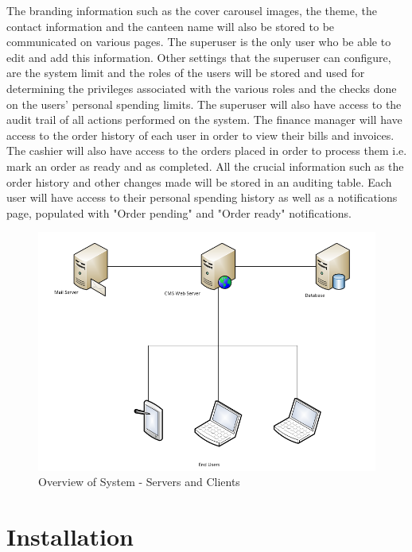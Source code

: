 \documentclass[a4paper,12pt]{report}
\begin{document}
 The branding information such as the cover carousel images, the theme, the contact information and the canteen name will also be stored to be communicated on various pages. The superuser is the only user who be able to edit and add this information. Other settings that the superuser can configure, are the system limit and the roles of the users will be stored and used for determining the privileges associated with the various roles and the checks done on the users' personal spending limits. The superuser will also have access to the audit trail of all actions performed on the system. The finance manager will have access to the order history of each user in order to view their bills and invoices. The cashier will also have access to the orders placed in order to process them i.e. mark an order as ready and as completed. All the crucial information such as the order history and other changes made will be stored in an auditing table. Each user will have access to their personal spending history as well as a notifications page, populated with "Order pending" and "Order ready" notifications.
\begin{figure}[H]
  \centering
    \includegraphics[width=1.0\textwidth]{screenshots/ServerClients.png}
    \caption{Overview of System - Servers and Clients} 
\end{figure}

\section{Installation}
\end{document}
